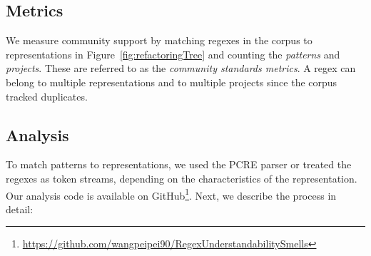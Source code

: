 \subsection{Metrics}
\label{sec:communitymetric}
We measure community support by matching regexes in the corpus to representations in Figure~\ref{fig:refactoringTree} and counting the \emph{patterns} and \emph{projects}. These are referred to as the \emph{community standards metrics}.
A regex can belong to multiple representations and to multiple projects since the corpus tracked duplicates.

%
%






\subsection{Analysis}
\label{communityanalysis}
To match patterns to representations, we used the PCRE parser or treated the regexes as token streams, depending on the characteristics of the representation. Our analysis code is available on GitHub\footnote{\url{https://github.com/wangpeipei90/RegexUnderstandabilitySmells}}.
Next, we describe the process in detail:

